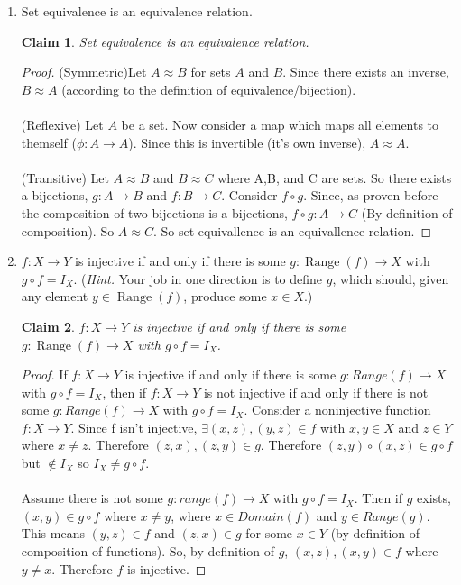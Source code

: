 \documentclass[11pt]{letter}
\newtheorem{claim}{Claim}
\theoremstyle{definition}
\begin{document}
\begin{description}
\begin{enumerate}
\item Set equivalence is an equivalence relation.
  \begin{claim}
    Set equivalence is an equivalence relation.
  \end{claim}
  \begin{proof}
    (Symmetric)Let $A\approx B$ for sets $A$ and $B$. Since there exists an inverse, $B\approx A$ (according to the definition of equivalence/bijection).\\ \\
  (Reflexive) Let $A$ be a set. Now consider a map which maps all elements to themself ($\phi:A\rightarrow A$). Since this is invertible (it's own inverse), $A\approx A$.\\ \\
  (Transitive) Let $A\approx B$ and $B\approx C$ where A,B, and C are sets. So there exists a bijections, $g:A\rightarrow B$ and $f:B\rightarrow C$. Consider $f\circ g$. Since, as proven before the composition of two bijections is a bijections, $f\circ g:A\rightarrow C$ (By definition of composition). So $A\approx C$. So set equivallence is an equivallence relation.
\end{proof}

\item $f:X\rightarrow Y$ is injective if and only if there is some $g:\operatorname{Range}(f)\rightarrow X$ with $g\circ f = I_X$. ({\em Hint.} Your job in one direction is to define $g$, which should, given any element $y\in \operatorname{Range}(f)$, produce some $x\in X$.)
  \begin{claim}
    $f:X\rightarrow Y$ is injective if and only if there is some $g:\operatorname{Range}(f)\rightarrow X$ with $g\circ f = I_X$.
  \end{claim}
  \begin{proof}
    If $f:X\rightarrow Y$ is injective if and only if there is some $g:Range(f)\rightarrow X$ with $g\circ f=I_X$, then if $f:X\rightarrow Y$ is not injective if and only if there is not some $g:Range(f)\rightarrow X$ with $g\circ f=I_X$. Consider a noninjective function $f:X\rightarrow Y$. Since f isn't injective, $\exists (x,z),(y,z)\in f$ with $x,y\in X$ and $z\in Y$ where $x\neq z$. Therefore $(z,x),(z,y)\in g$. Therefore $(z,y)\circ (x,z)\in g\circ f$ but $\notin I_X$ so $I_X\neq g\circ f$.\\ \\
    Assume there is not some $g:range(f)\rightarrow X$ with $g\circ f=I_X$. Then if $g$ exists, $(x,y)\in g\circ f$ where $x\neq y$, where $x\in Domain(f)$ and $y\in Range(g)$. This means $(y,z)\in f$ and $(z,x)\in g$ for some $x\in Y$ (by definition of composition of functions). So, by definition of $g$, $(x,z),(x,y)\in f$ where $y\neq x$. Therefore $f$ is injective.
  \end{proof}
  

\end{enumerate}
\end{description}
\end{document}
